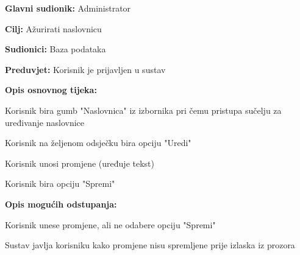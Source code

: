					\noindent {}
					\begin{packed_item}
						\item \textbf{Glavni sudionik:} Administrator
						\item \textbf{Cilj:} Ažurirati naslovnicu
						\item \textbf{Sudionici:} Baza podataka
						\item \textbf{Preduvjet:} Korisnik je prijavljen u sustav
						
						\item \textbf{Opis osnovnog tijeka:} 
						\item[] \begin{packed_enum}
							\item Korisnik bira gumb "Naslovnica" iz izbornika pri čemu pristupa sučelju za uređivanje naslovnice
							\item Korisnik na željenom odsječku bira opciju "Uredi"
							\item Korisnik unosi promjene (uređuje tekst)
							\item Korisnik bira opciju "Spremi"
						\end{packed_enum}
					
						\item \textbf{Opis mogućih odstupanja:}
						\item[] \begin{packed_enum}

							\item[3.a] Korisnik unese promjene, ali ne odabere opciju "Spremi"
							\item[] \begin{packed_enum}
								\item[1.] Sustav javlja korisniku kako promjene nisu spremljene prije izlaska iz prozora
							\end{packed_enum}
							
						\end{packed_enum}
					\end{packed_item}

					


